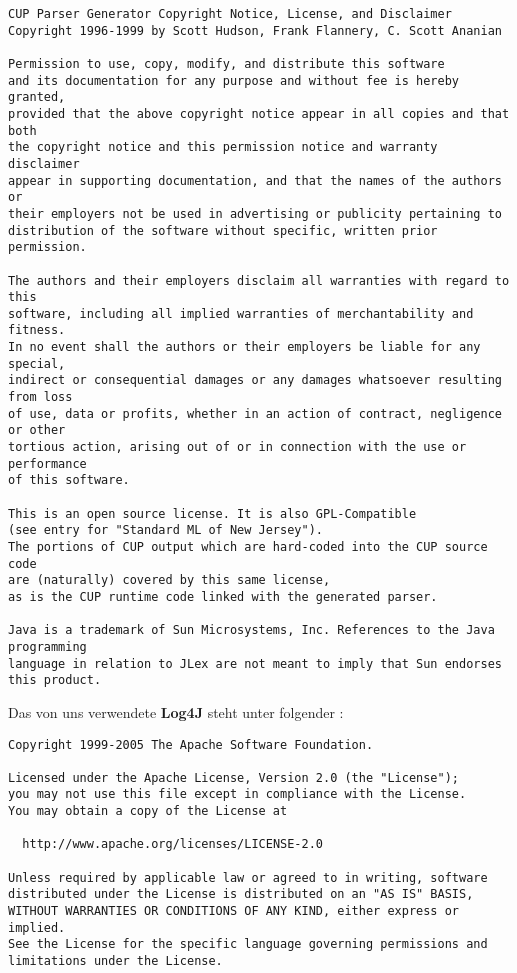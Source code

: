 \begin{verbatim}
CUP Parser Generator Copyright Notice, License, and Disclaimer
Copyright 1996-1999 by Scott Hudson, Frank Flannery, C. Scott Ananian

Permission to use, copy, modify, and distribute this software
and its documentation for any purpose and without fee is hereby granted,
provided that the above copyright notice appear in all copies and that both
the copyright notice and this permission notice and warranty disclaimer
appear in supporting documentation, and that the names of the authors or
their employers not be used in advertising or publicity pertaining to
distribution of the software without specific, written prior permission.

The authors and their employers disclaim all warranties with regard to this
software, including all implied warranties of merchantability and fitness.
In no event shall the authors or their employers be liable for any special,
indirect or consequential damages or any damages whatsoever resulting from loss
of use, data or profits, whether in an action of contract, negligence or other
tortious action, arising out of or in connection with the use or performance
of this software.

This is an open source license. It is also GPL-Compatible
(see entry for "Standard ML of New Jersey").
The portions of CUP output which are hard-coded into the CUP source code
are (naturally) covered by this same license,
as is the CUP runtime code linked with the generated parser.

Java is a trademark of Sun Microsystems, Inc. References to the Java programming
language in relation to JLex are not meant to imply that Sun endorses this product.
\end{verbatim}

Das von uns verwendete {\bf Log4J} steht unter folgender :

\begin{verbatim}
Copyright 1999-2005 The Apache Software Foundation.

Licensed under the Apache License, Version 2.0 (the "License");
you may not use this file except in compliance with the License.
You may obtain a copy of the License at

  http://www.apache.org/licenses/LICENSE-2.0

Unless required by applicable law or agreed to in writing, software
distributed under the License is distributed on an "AS IS" BASIS,
WITHOUT WARRANTIES OR CONDITIONS OF ANY KIND, either express or implied.
See the License for the specific language governing permissions and
limitations under the License.
\end{verbatim}

